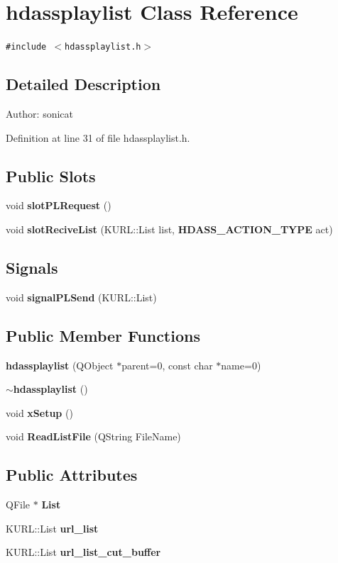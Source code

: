 \section{hdassplaylist Class Reference}
\label{classhdassplaylist}
{\tt \#include $<$hdassplaylist.h$>$}



\subsection{Detailed Description}
\begin{Desc}
\item[Author:]sonicat \end{Desc}




Definition at line 31 of file hdassplaylist.h.\subsection*{Public Slots}
\begin{CompactItemize}
\item 
void {\bf slot\-PLRequest} ()
\item 
void {\bf slot\-Recive\-List} (KURL::List list, {\bf HDASS\_\-ACTION\_\-TYPE} act)
\end{CompactItemize}
\subsection*{Signals}
\begin{CompactItemize}
\item 
void {\bf signal\-PLSend} (KURL::List)
\end{CompactItemize}
\subsection*{Public Member Functions}
\begin{CompactItemize}
\item 
{\bf hdassplaylist} (QObject $\ast$parent=0, const char $\ast$name=0)
\item 
{\bf $\sim$hdassplaylist} ()
\item 
void {\bf x\-Setup} ()
\item 
void {\bf Read\-List\-File} (QString File\-Name)
\end{CompactItemize}
\subsection*{Public Attributes}
\begin{CompactItemize}
\item 
QFile $\ast$ {\bf List}
\item 
KURL::List {\bf url\_\-list}
\item 
KURL::List {\bf url\_\-list\_\-cut\_\-buffer}
\end{CompactItemize}
